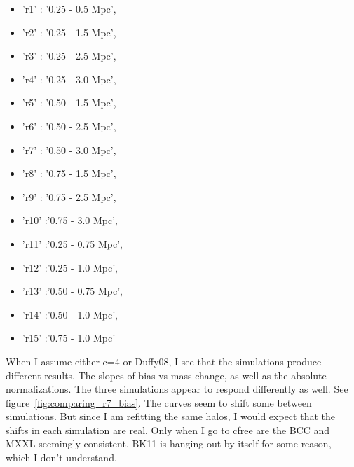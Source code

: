 \documentclass[11pt]{article}
\begin{document}
\begin{itemize}
\item 'r1' : '0.25 - 0.5 Mpc',
\item 'r2' : '0.25 - 1.5 Mpc',
\item 'r3' : '0.25 - 2.5 Mpc',
\item 'r4' : '0.25 - 3.0 Mpc',
\item 'r5' : '0.50 - 1.5 Mpc',
\item 'r6' : '0.50 - 2.5 Mpc',
\item 'r7' : '0.50 - 3.0 Mpc',
\item 'r8' : '0.75 - 1.5 Mpc',
\item 'r9' : '0.75 - 2.5 Mpc',
\item 'r10' :'0.75 - 3.0 Mpc',
\item 'r11' :'0.25 - 0.75 Mpc',
\item 'r12' :'0.25 - 1.0 Mpc',
\item 'r13' :'0.50 - 0.75 Mpc',
\item 'r14' :'0.50 - 1.0 Mpc',
\item 'r15' :'0.75 - 1.0 Mpc'
\end{itemize}


When I assume either c=4 or Duffy08, I see that the simulations produce different results. The slopes of bias vs mass change, as well as the absolute normalizations. The three simulations appear to respond differently as well. See figure~\ref{fig:comparing_r7_bias}. The curves seem to shift some between simulations. But since I am refitting the same halos, I would expect that the shifts in each simulation are real. Only when I go to cfree are the BCC and MXXL seemingly consistent. BK11 is hanging out by itself for some reason, which I don't understand.
\end{document}
